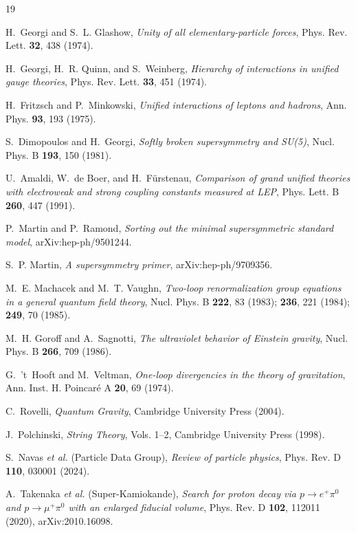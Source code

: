 \documentclass[11pt]{article}
\theoremstyle{remark}
\begin{document}
\begin{thebibliography}{19}

 H.~Georgi and S.~L. Glashow, \emph{Unity of
all elementary-particle forces}, Phys. Rev. Lett. \textbf{32}, 438
(1974).

 H.~Georgi, H.~R. Quinn, and S.~Weinberg, \emph{Hierarchy
of interactions in unified gauge theories}, Phys. Rev. Lett.
\textbf{33}, 451 (1974).

 H.~Fritzsch and P.~Minkowski,
\emph{Unified interactions of leptons and hadrons}, Ann. Phys.
\textbf{93}, 193 (1975).

 S.~Dimopoulos and H.~Georgi, \emph{Softly
broken supersymmetry and SU(5)}, Nucl. Phys. B \textbf{193}, 150
(1981).

 U.~Amaldi, W.~de Boer, and H.~F\"urstenau,
\emph{Comparison of grand unified theories with electroweak and strong
coupling constants measured at LEP}, Phys. Lett. B \textbf{260}, 447
(1991).

 P.~Martin and P.~Ramond, \emph{Sorting out the
minimal supersymmetric standard model}, arXiv:hep-ph/9501244.

 S.~P. Martin, \emph{A supersymmetry primer},
arXiv:hep-ph/9709356.

 M.~E. Machacek and M.~T. Vaughn,
\emph{Two-loop renormalization group equations in a general quantum
field theory}, Nucl. Phys. B \textbf{222}, 83 (1983); \textbf{236},
221 (1984); \textbf{249}, 70 (1985).

 M.~H. Goroff and A.~Sagnotti, \emph{The
ultraviolet behavior of Einstein gravity}, Nucl. Phys. B \textbf{266},
709 (1986).

 G.~'t~Hooft and M.~Veltman, \emph{One-loop
divergencies in the theory of gravitation}, Ann. Inst. H. Poincar\'e A
\textbf{20}, 69 (1974).

 C.~Rovelli, \emph{Quantum Gravity}, Cambridge
University Press (2004).

 J.~Polchinski, \emph{String Theory}, Vols. 1--2,
Cambridge University Press (1998).

 S.~Navas \emph{et al.} (Particle Data Group),
\emph{Review of particle physics}, Phys. Rev. D \textbf{110}, 030001
(2024).

 A.~Takenaka \emph{et al.} (Super-Kamiokande),
\emph{Search for proton decay via $p\to e^+\pi^0$ and $p\to\mu^+\pi^0$
with an enlarged fiducial volume}, Phys. Rev. D \textbf{102}, 112011
(2020), arXiv:2010.16098.


\end{thebibliography}
\end{document}
